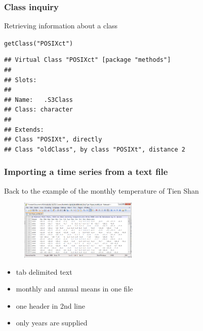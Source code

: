 \documentclass[xcolor=table, xcolor=dvipsnames]{beamer}\usepackage[]{graphicx}\usepackage[]{color}
\makeatletter
\newcommand{\hlstr}[1]{\textcolor[rgb]{0.545,0.137,0.137}{#1}}
\newcommand{\hlstd}[1]{\textcolor[rgb]{0,0,0}{#1}}
\newcommand{\hlkwd}[1]{\textcolor[rgb]{0,0,1}{#1}}
\newenvironment{kframe}{%
 \def\at@end@of@kframe{}%
 \ifinner\ifhmode%
  \def\at@end@of@kframe{\end{minipage}}%
  \begin{minipage}{\columnwidth}%
 \fi\fi%
 \def\FrameCommand##1{\hskip\@totalleftmargin \hskip-\fboxsep
 \colorbox{shadecolor}{##1}\hskip-\fboxsep
     \hskip-\linewidth \hskip-\@totalleftmargin \hskip\columnwidth}%
 \MakeFramed {\advance\hsize-\width
   \@totalleftmargin\z@ \linewidth\hsize
   \@setminipage}}%
 {\par\unskip\endMakeFramed%
 \at@end@of@kframe}
\newenvironment{knitrout}{}{} %
\makeatother
\begin{document}
\begin{frame}[fragile]\frametitle{Class inquiry}
Retrieving information about a class 
\begin{knitrout}
\color{fgcolor}\begin{kframe}
\begin{alltt}
\hlkwd{getClass}\hlstd{(}\hlstr{"POSIXct"}\hlstd{)}
\end{alltt}
\begin{verbatim}
## Virtual Class "POSIXct" [package "methods"]
## 
## Slots:
##                 
## Name:   .S3Class
## Class: character
## 
## Extends: 
## Class "POSIXt", directly
## Class "oldClass", by class "POSIXt", distance 2
\end{verbatim}
\end{kframe}
\end{knitrout}
\end{frame}


\begin{frame}\frametitle{Importing a time series from a text file}
Back to the example of the monthly temperature of Tien Shan
\begin{figure}[h]
\includegraphics[width=0.5\textwidth]{./externalfig/SS_Tyan-Shyan_monthly_txt.png}
\end{figure}
 \begin{itemize}
\item tab delimited text
\item monthly and annual means in one file
\item one header in 2nd line
\item only years are supplied
 \end{itemize}
\end{frame}

\end{document}
